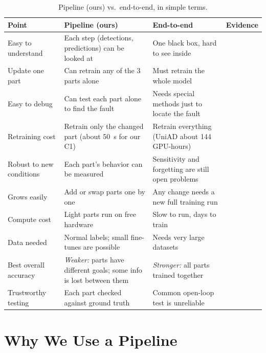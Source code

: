 \documentclass[11pt,a4paper]{article}
\begin{document}
\begin{table}[h!]
\centering
\caption{Pipeline (ours) vs.\ end-to-end, in simple terms.}
\label{tab:e2e_vs_pipeline}
\small
\renewcommand{\arraystretch}{1.3}
\begin{tabular}{@{}L{2.3cm}L{4.1cm}L{4.1cm}L{2.4cm}@{}}
\toprule
\textbf{Point} & \textbf{Pipeline (ours)} & \textbf{End-to-end} & \textbf{Evidence} \\
\midrule
Easy to understand & Each step (detections, predictions) can be looked at & One black box, hard to see inside & \cite{chen2024e2esurvey,hu2025vla} \\
Update one part & Can retrain any of the 3 parts alone & Must retrain the whole model & \cite{ma2025correctad,liu2025r2se} \\
Easy to debug & Can test each part alone to find the fault & Needs special methods just to locate the fault & \cite{chen2024e2esurvey,ma2025correctad} \\
Retraining cost & Retrain only the changed part (about 50~s for our C1) & Retrain everything (UniAD about 144 GPU-hours) & \cite{sun2024sparsedrive,ma2025correctad} \\
Robust to new conditions & Each part's behavior can be measured & Sensitivity and forgetting are still open problems & \cite{chen2024e2esurvey,liu2025r2se} \\
Grows easily & Add or swap parts one by one & Any change needs a new full training run & \cite{chen2024e2esurvey,sun2024sparsedrive} \\
Compute cost & Light parts run on free hardware & Slow to run, days to train & \cite{weng2024paradrive,sun2024sparsedrive} \\
Data needed & Normal labels; small fine-tunes are possible & Needs very large datasets & \cite{chen2024e2esurvey,ma2025correctad} \\
\midrule
Best overall accuracy & \emph{Weaker:} parts have different goals; some info is lost between them & \emph{Stronger:} all parts trained together & \cite{hu2023uniad,sun2024sparsedrive} \\
Trustworthy testing & Each part checked against ground truth & Common open-loop test is unreliable & \cite{codevilla2018offline,zhai2023rethinking,dauner2023parting} \\
\bottomrule
\end{tabular}
\end{table}

\section{Why We Use a Pipeline}
\end{document}
